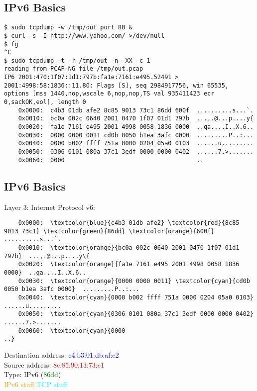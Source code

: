 \documentclass[xga]{xdvislides}
\begin{document}
\subsection{IPv6 Basics}
\begin{verbatim}
$ sudo tcpdump -w /tmp/out port 80 &
$ curl -s -I http://www.yahoo.com/ >/dev/null
$ fg
^C
$ sudo tcpdump -t -r /tmp/out -n -XX -c 1
reading from PCAP-NG file /tmp/out.pcap
IP6 2001:470:1f07:1d1:797b:fa1e:7161:e495.52491 > 2001:4998:58:1836::11.80: Flags [S], seq 2984917756, win 65535, options [mss 1440,nop,wscale 6,nop,nop,TS val 935411423 ecr 0,sackOK,eol], length 0
	0x0000:  c4b3 01db afe2 8c85 9013 73c1 86dd 600f  ..........s...`.
	0x0010:  bc0a 002c 0640 2001 0470 1f07 01d1 797b  ...,.@...p....y{
	0x0020:  fa1e 7161 e495 2001 4998 0058 1836 0000  ..qa....I..X.6..
	0x0030:  0000 0000 0011 cd0b 0050 b1ea 3afc 0000  .........P..:...
	0x0040:  0000 b002 ffff 751a 0000 0204 05a0 0103  ......u.........
	0x0050:  0306 0101 080a 37c1 3edf 0000 0000 0402  ......7.>.......
	0x0060:  0000                                     ..
\end{verbatim}

\subsection{IPv6 Basics}
Layer 3: Internet Protocol v6: \\
\begin{Verbatim}
	0x0000:  \textcolor{blue}{c4b3 01db afe2} \textcolor{red}{8c85 9013 73c1} \textcolor{green}{86dd} \textcolor{orange}{600f}  ..........s...`.
	0x0010:  \textcolor{orange}{bc0a 002c 0640 2001 0470 1f07 01d1 797b}  ...,.@...p....y\{
	0x0020:  \textcolor{orange}{fa1e 7161 e495 2001 4998 0058 1836 0000}  ..qa....I..X.6..
	0x0030:  \textcolor{orange}{0000 0000 0011} \textcolor{cyan}{cd0b 0050 b1ea 3afc 0000}  .........P..:...
	0x0040:  \textcolor{cyan}{0000 b002 ffff 751a 0000 0204 05a0 0103}  ......u.........
	0x0050:  \textcolor{cyan}{0306 0101 080a 37c1 3edf 0000 0000 0402}  ......7.>.......
	0x0060:  \textcolor{cyan}{0000                                     ..}
\end{Verbatim}

\vspace{.25in}
Destination address: \textcolor{blue}{c4:b3:01:db:af:e2} \\
Source address: \textcolor{red}{8c:85:90:13:73:c1} \\
Type: IPv6 (\textcolor{green}{86dd}) \\
\textcolor{orange}{IPv6 stuff}
\textcolor{cyan}{TCP stuff}
\vspace{.15in}
\end{document}
